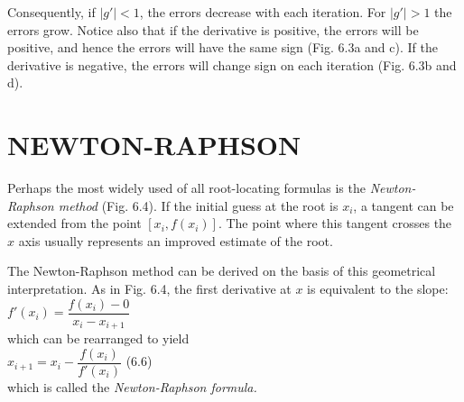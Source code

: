 \documentclass[../main.tex]{subfiles}
\begin{document}
\noindent Consequently, if $\left\lvert g' \right\rvert < 1$, the errors decrease with each iteration. For $\left\lvert g' \right\rvert > 1$ the errors
grow. Notice also that if the derivative is positive, the errors will be positive, and hence the
errors will have the same sign (Fig. 6.3a and c). If the derivative is negative, the errors will
change sign on each iteration (Fig. 6.3b and d).\\
\bigskip

\section[NEWTON-RAPHSON]{NEWTON-RAPHSON}
\noindent Perhaps the most widely used of all root-locating formulas is the \emph{Newton-Raphson method}
(Fig. 6.4). If the initial guess at the root is $x_i$, a tangent can be extended from the point
$[x_i , f (x_i )]$. The point where this tangent crosses the $x$ axis usually represents an improved
estimate of the root.

The Newton-Raphson method can be derived on the basis of this geometrical interpretation.
As in Fig. 6.4, the first derivative at $x$ is equivalent to the slope:\\

$f'(x_i) = \dfrac{f(x_i)-0}{x_i-x_{i+1}}$\\

\noindent which can be rearranged to yield\\

$x_{i+1} = x_i - \dfrac{f(x_i)}{f'(x_i)}$
\hfill (6.6)\\

\noindent which is called the \emph{Newton-Raphson formula.}\\
\end{document}
